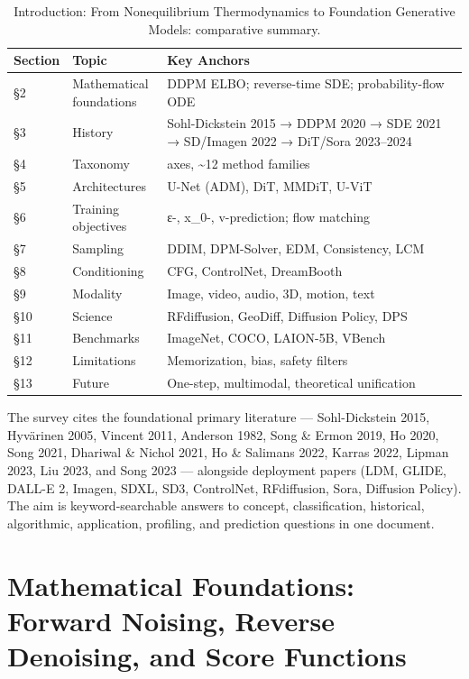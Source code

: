 \documentclass{article}
\begin{document}
\begin{table}[t]
\centering
\caption{Introduction: From Nonequilibrium Thermodynamics to Foundation Generative Models: comparative summary.}
\label{tab:introduction-from-nonequilibrium-thermodynamics-to-foundatio}
\begin{tabular}{>{\raggedright\arraybackslash}p{0.0631\linewidth}
  >{\raggedright\arraybackslash}p{0.2162\linewidth}
  >{\raggedright\arraybackslash}p{0.7207\linewidth}}
\toprule
Section & Topic & Key Anchors \\
\midrule
§2 & Mathematical foundations & DDPM ELBO; reverse-time SDE; probability-flow ODE \\
§3 & History & Sohl-Dickstein 2015 → DDPM 2020 → SDE 2021 → SD/Imagen 2022 → DiT/Sora 2023--2024 \\
§4 & Taxonomy & 5 axes, \textasciitilde12 method families \\
§5 & Architectures & U-Net (ADM), DiT, MMDiT, U-ViT \\
§6 & Training objectives & ε-, x\_0-, v-prediction; flow matching \\
§7 & Sampling & DDIM, DPM-Solver, EDM, Consistency, LCM \\
§8 & Conditioning & CFG, ControlNet, DreamBooth \\
§9 & Modality & Image, video, audio, 3D, motion, text \\
§10 & Science & RFdiffusion, GeoDiff, Diffusion Policy, DPS \\
§11 & Benchmarks & ImageNet, COCO, LAION-5B, VBench \\
§12 & Limitations & Memorization, bias, safety filters \\
§13 & Future & One-step, multimodal, theoretical unification \\
\end{tabular}
\end{table}

The survey cites the foundational primary literature --- Sohl-Dickstein 2015, Hyvärinen 2005, Vincent 2011, Anderson 1982, Song \& Ermon 2019, Ho 2020, Song 2021, Dhariwal \& Nichol 2021, Ho \& Salimans 2022, Karras 2022, Lipman 2023, Liu 2023, and Song 2023 --- alongside deployment papers (LDM, GLIDE, DALL-E 2, Imagen, SDXL, SD3, ControlNet, RFdiffusion, Sora, Diffusion Policy). The aim is keyword-searchable answers to concept, classification, historical, algorithmic, application, profiling, and prediction questions in one document.

\section{Mathematical Foundations: Forward Noising, Reverse Denoising, and Score Functions}\label{mathematical-foundations-forward-noising-reverse-denoising-and-score-functions}
\end{document}
